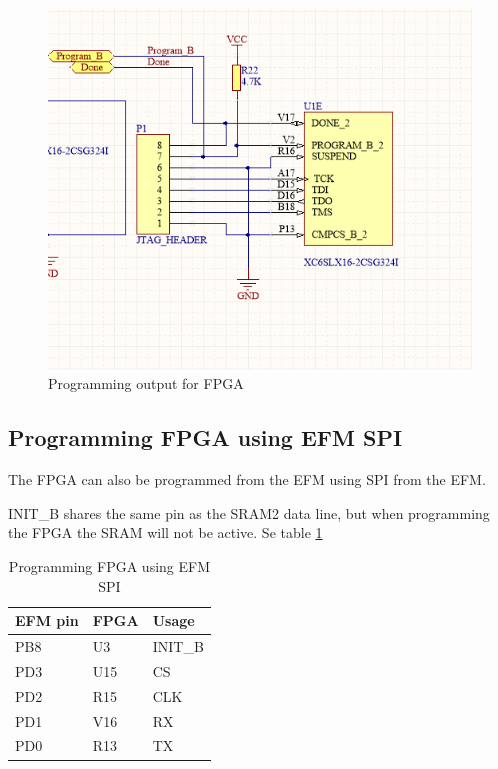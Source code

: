 \begin{figure}
    \includegraphics[width=\linewidth]{img/FPGA_Programmer}
    \caption{Programming output for FPGA}
    \label{fig:FpgaProgrammer}
\end{figure}

\subsection{Programming FPGA using EFM SPI}
The FPGA can also be programmed from the EFM using SPI from the EFM.

INIT\_B shares the same pin as the SRAM2 data line, but when programming the FPGA the SRAM will not be active.
Se table \ref{tab:SpiProgrammer}

\begin{table}[]
    \centering
    \begin{tabular}{lll}
        EFM pin & FPGA & Usage   \\
        \hline
        PB8     & U3   & INIT\_B \\
        PD3     & U15  & CS      \\
        PD2     & R15  & CLK     \\
        PD1     & V16  & RX      \\
        PD0     & R13  & TX
    \end{tabular}
    \caption{Programming FPGA using EFM SPI}
    \label{tab:SpiProgrammer}
\end{table}

